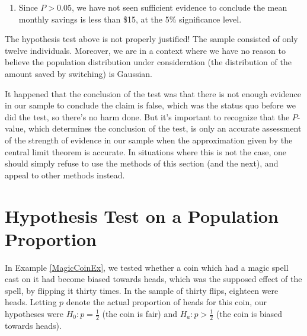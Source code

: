 \begin{example}
\begin{enumerate}[label=\textnormal{\Roman*}.]
\begin{center}
\end{center}
Consulting a table of values for the T-distribution, we can find the critical value which produces a tail area of 5\% is $t^* = -1.796$. Therefore, the P-value in our test is (much) larger than 5\%. Using a computer to explicitly compute the area gives $P = 0.234$.

\item Since $P > 0.05$, we have not seen sufficient evidence to conclude the mean monthly savings is less than \$15, at the 5\% significance level.
\end{enumerate}
\end{example}

\begin{warning}
The hypothesis test above is not properly justified! The sample consisted of only twelve individuals. Moreover, we are in a context where we have no reason to believe the population distribution under consideration (the distribution of the amount saved by switching) is Gaussian.
\end{warning}

It happened that the conclusion of the test was that there is not enough evidence in our sample to conclude the claim is false, which was the status quo before we did the test, so there's no harm done. But it's important to recognize that the $P$-value, which determines the conclusion of the test, is only an accurate assessment of the strength of evidence in our sample when the approximation given by the central limit theorem is accurate. In situations where this is not the case, one should simply refuse to use the methods of this section (and the next), and appeal to other methods instead.

\section{Hypothesis Test on a Population Proportion}

In Example \ref{MagicCoinEx}, we tested whether a coin which had a magic spell cast on it had become biased towards heads, which was the supposed effect of the spell, by flipping it thirty times. In the sample of thirty flips, eighteen were heads. Letting $p$ denote the actual proportion of heads for this coin, our hypotheses were $H_0: p = \frac{1}{2}$ (the coin is fair) and $H_a: p > \frac{1}{2}$ (the coin is biased towards heads). 


